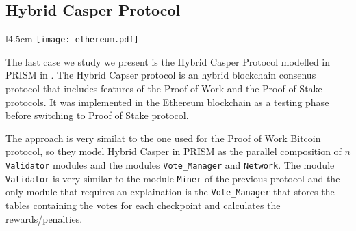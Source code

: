 \subsection{Hybrid Casper Protocol}
\begin{wrapfigure}[9]{l}{4.5cm}
	\texttt{[image: ethereum.pdf]}	
\end{wrapfigure} 
The last case we study we present is the Hybrid Casper Protocol modelled in PRISM in \cite{DBLP:journals/distribledger/GallettaLMV23}. 
The Hybrid Capser protocol is
an hybrid blockchain consenus protocol that includes features of the Proof of Work and the Proof of Stake protocols.
It was implemented in the Ethereum blockchain \cite{ethereum} as a testing phase before switching to Proof of Stake protocol.

The approach is very similat to the one used for the Proof of Work Bitcoin protocol,
so they model Hybrid Casper in PRISM as the parallel composition of $n$ \texttt{Validator} modules and the modules \texttt{Vote\_Manager} and \texttt{Network}.
The module \texttt{Validator} is very similar to the module \texttt{Miner} of the previous protocol and
the only module that requires an explaination is the \texttt{Vote\_Manager} that stores the tables containing the votes for each checkpoint and calculates the rewards/penalties.

